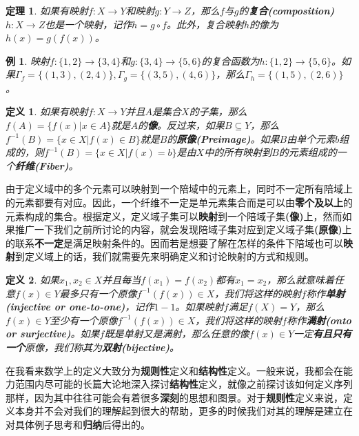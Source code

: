 \documentclass[mathserif,hyperref,UTF8,openany,b5paper]{ctexbook}
\newtheorem{exmp}{例}[section]
\newtheorem{defn}{定义}[section]
\newtheorem{thm}{定理}[section]
\begin{document}
\begin{thm}
如果有映射$f:X \xrightarrow{}Y$和映射$g: Y\xrightarrow{}Z$，那么$f$与$g$的\textbf{复合(composition)} $h:X \xrightarrow{} Z$也是一个映射，记作$h= g\circ f$。此外，复合映射$h$的像为$h(x)=g(f(x))$。
\end{thm}
\begin{exmp}
映射$f:\{1,2\} \xrightarrow{} \{3,4\}$和$g: \{3,4\}\xrightarrow{}\{5,6\}$的复合函数为$h:\{1,2\} \xrightarrow{} \{5,6\}$。如果$\Gamma_f=\{(1,3),(2,4)\},\Gamma_g=\{(3,5),(4,6)\}$，那么$\Gamma_h=\{(1, 5), (2, 6)\}$。
\end{exmp}
\begin{defn}
如果有映射$f:X \xrightarrow{} Y$并且$A$是集合$X$的子集，那么$f(A)=\{f(x)|x \in A\}$就是$A$的\textbf{像}。反过来，如果$B \subseteq Y$，那么$f^{-1}(B) = \{x \in X | f(x) \in B\}$就是$B$的\textbf{原像(Preimage)}。如果$B$由单个元素$b$组成的，则$f^{−1}(B)=\{x\in X | f(x)= b\}$是由$X$中的所有映射到$B$的元素组成的一个\textbf{纤维(Fiber)}。
\end{defn}

由于定义域中的多个元素可以映射到一个陪域中的元素上，同时不一定所有陪域上的元素都要有对应。因此，一个纤维不一定是单元素集合而是可以由\textbf{零个及以上}的元素构成的集合。根据定义，定义域子集可以\textbf{映射}到一个陪域子集\textbf{(像)}上，然而如果推广一下我们之前所讨论的内容，就会发现陪域子集对应到定义域子集\textbf{(原像)}上的联系\textbf{不一定}是满足映射条件的。因而若是想要了解在怎样的条件下陪域也可以\textbf{映射}到定义域上的话，我们就需要先来明确定义和讨论映射的方式和规则。

\begin{defn}
如果$x_1,x_2 \in X$并且每当$f(x_1)=f(x_2)$都有$x_1 = x_2$，那么就意味着任意$f(x)\in Y$最多只有一个原像$f^{-1}(f(x)) \in X$，我们将这样的映射$f$称作\textbf{单射(injective or one-to-one)}，记作$1-1$。如果映射$f$满足$f(X)=Y$，那么$f(x)\in Y$至少有一个原像$f^{-1}(f(x)) \in X$，我们将这样的映射$f$称作\textbf{满射(onto or surjective)}。如果$f$既是单射又是满射，那么任意的像$f(x)\in Y$一定\textbf{有且只有一个}原像，我们称其为\textbf{双射(bijective)}。
\end{defn}

在我看来数学上的定义大致分为\textbf{规则性}定义和\textbf{结构性}定义。一般来说，我都会在能力范围内尽可能的长篇大论地深入探讨\textbf{结构性}定义，就像之前探讨该如何定义序列那样，因为其中往往可能会有着很多\textbf{深刻}的思想和图景。对于\textbf{规则性}定义来说，定义本身并不会对我们的理解起到很大的帮助，更多的时候我们对其的理解是建立在对具体例子思考和\textbf{归纳}后得出的。
\end{document}
